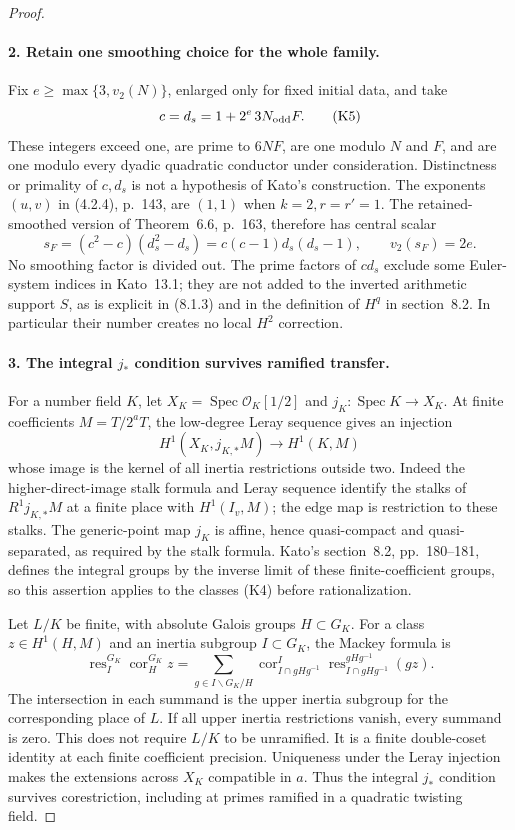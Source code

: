\documentclass[11pt]{article}
\theoremstyle{definition}
\theoremstyle{remark}
\begin{document}
\begin{proof}
\paragraph{2. Retain one smoothing choice for the whole family.}
Fix $e\geq\max\{3,v_2(N)\}$, enlarged only for fixed initial data,
and take
\[
                 c=d_s=1+2^e\,3N_{\rm odd}F.              \tag{K5}
\]
These integers exceed one, are prime to $6NF$, are one modulo $N$
and $F$, and are one modulo every dyadic quadratic conductor under
consideration. Distinctness or primality of $c,d_s$ is not a
hypothesis of Kato's construction. The exponents $(u,v)$ in (4.2.4),
p.~143, are $(1,1)$ when $k=2,r=r'=1$. The retained-smoothed
version of Theorem~6.6, p.~163, therefore has central scalar
\[
 s_F=(c^2-c)(d_s^2-d_s)=c(c-1)d_s(d_s-1),
                   \qquad v_2(s_F)=2e.                   \tag{K6}
\]
No smoothing factor is divided out. The prime factors of $cd_s$
exclude some Euler-system indices in Kato~13.1; they are not added
to the inverted arithmetic support $S$, as is explicit in (8.1.3)
and in the definition of $H^q$ in section~8.2. In particular their
number creates no local $H^2$ correction.

\paragraph{3. The integral $j_*$ condition survives ramified transfer.}
For a number field $K$, let $X_K=\operatorname{Spec}\mathcal O_K[1/2]$
and $j_K:\operatorname{Spec}K\to X_K$. At finite coefficients
$M=T/2^aT$, the low-degree Leray sequence gives an injection
\[
 H^1(X_K,j_{K,*}M)\longrightarrow H^1(K,M)
\]
whose image is the kernel of all inertia restrictions outside two.
Indeed the higher-direct-image stalk formula and Leray sequence
\cite[Tags 03Q9 and 03QA]{stackscohom} identify the stalks of
$R^1j_{K,*}M$ at a finite place with $H^1(I_v,M)$;
the edge map is restriction to these stalks. The generic-point map
$j_K$ is affine, hence quasi-compact and quasi-separated, as required
by the stalk formula. Kato's section~8.2,
pp.~180--181, defines the integral groups by the inverse limit of
these finite-coefficient groups, so this assertion applies to the
classes (K4) before rationalization.

Let $L/K$ be finite, with absolute Galois groups $H\subset G_K$.
For a class $z\in H^1(H,M)$ and an inertia subgroup $I\subset G_K$,
the Mackey formula is
\[
 \operatorname{res}_{I}^{G_K}\operatorname{cor}_{H}^{G_K}z
 =\sum_{g\in I\backslash G_K/H}
   \operatorname{cor}_{I\cap gHg^{-1}}^{I}
   \operatorname{res}_{I\cap gHg^{-1}}^{gHg^{-1}}(g z).    \tag{K7}
\]
The intersection in each summand is the upper inertia subgroup
for the corresponding place of $L$. If all upper inertia
restrictions vanish, every summand is zero. This does not require
$L/K$ to be unramified. It is a finite double-coset identity at each
finite coefficient precision. Uniqueness under the Leray injection
makes the extensions across $X_K$ compatible in $a$. Thus the
integral $j_*$ condition survives corestriction, including at primes
ramified in a quadratic twisting field.


\end{proof}
\end{document}
